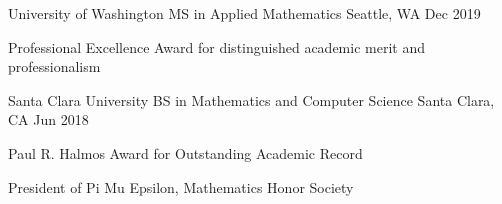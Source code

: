 
\begin{cventries}

  \cventry
    {University of Washington} %
    {MS in Applied Mathematics} %
    {Seattle, WA} %
    {Dec 2019} %
    {
      \begin{cvitems} %
        \item {Professional Excellence Award for distinguished academic merit and professionalism}
      \end{cvitems}
    }

  \cventry    
    {Santa Clara University} %
    {BS in Mathematics and Computer Science} %
    {Santa Clara, CA} %
    {Jun 2018} %
    {
      \begin{cvitems} %
        \item {Paul R. Halmos Award for Outstanding Academic Record}  
        \item {President of Pi Mu Epsilon, Mathematics Honor Society}
      \end{cvitems}
    }

\end{cventries}

